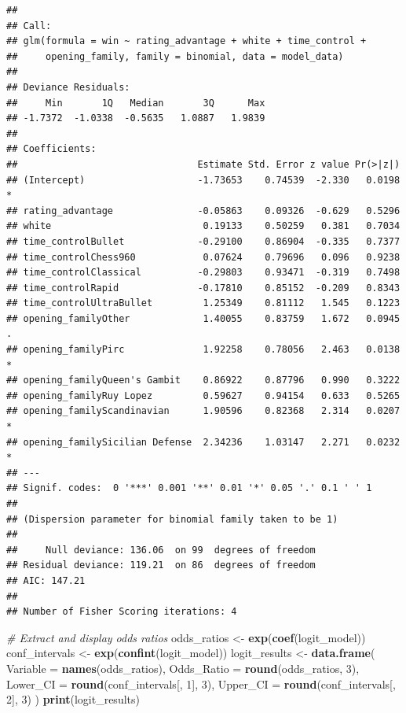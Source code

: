 \documentclass[
]{article}
\newenvironment{Shaded}{\begin{snugshade}}{\end{snugshade}}
\newcommand{\AttributeTok}[1]{\textcolor[rgb]{0.13,0.29,0.53}{#1}}
\newcommand{\CommentTok}[1]{\textcolor[rgb]{0.56,0.35,0.01}{\textit{#1}}}
\newcommand{\DecValTok}[1]{\textcolor[rgb]{0.00,0.00,0.81}{#1}}
\newcommand{\FunctionTok}[1]{\textcolor[rgb]{0.13,0.29,0.53}{\textbf{#1}}}
\newcommand{\NormalTok}[1]{#1}
\newcommand{\OtherTok}[1]{\textcolor[rgb]{0.56,0.35,0.01}{#1}}
\begin{document}
\begin{verbatim}
## 
## Call:
## glm(formula = win ~ rating_advantage + white + time_control + 
##     opening_family, family = binomial, data = model_data)
## 
## Deviance Residuals: 
##     Min       1Q   Median       3Q      Max  
## -1.7372  -1.0338  -0.5635   1.0887   1.9839  
## 
## Coefficients:
##                                Estimate Std. Error z value Pr(>|z|)  
## (Intercept)                    -1.73653    0.74539  -2.330   0.0198 *
## rating_advantage               -0.05863    0.09326  -0.629   0.5296  
## white                           0.19133    0.50259   0.381   0.7034  
## time_controlBullet             -0.29100    0.86904  -0.335   0.7377  
## time_controlChess960            0.07624    0.79696   0.096   0.9238  
## time_controlClassical          -0.29803    0.93471  -0.319   0.7498  
## time_controlRapid              -0.17810    0.85152  -0.209   0.8343  
## time_controlUltraBullet         1.25349    0.81112   1.545   0.1223  
## opening_familyOther             1.40055    0.83759   1.672   0.0945 .
## opening_familyPirc              1.92258    0.78056   2.463   0.0138 *
## opening_familyQueen's Gambit    0.86922    0.87796   0.990   0.3222  
## opening_familyRuy Lopez         0.59627    0.94154   0.633   0.5265  
## opening_familyScandinavian      1.90596    0.82368   2.314   0.0207 *
## opening_familySicilian Defense  2.34236    1.03147   2.271   0.0232 *
## ---
## Signif. codes:  0 '***' 0.001 '**' 0.01 '*' 0.05 '.' 0.1 ' ' 1
## 
## (Dispersion parameter for binomial family taken to be 1)
## 
##     Null deviance: 136.06  on 99  degrees of freedom
## Residual deviance: 119.21  on 86  degrees of freedom
## AIC: 147.21
## 
## Number of Fisher Scoring iterations: 4
\end{verbatim}

\begin{Shaded}
\begin{Highlighting}[]
\CommentTok{\# Extract and display odds ratios}
\NormalTok{odds\_ratios }\OtherTok{\textless{}{-}} \FunctionTok{exp}\NormalTok{(}\FunctionTok{coef}\NormalTok{(logit\_model))}
\NormalTok{conf\_intervals }\OtherTok{\textless{}{-}} \FunctionTok{exp}\NormalTok{(}\FunctionTok{confint}\NormalTok{(logit\_model))}
\NormalTok{logit\_results }\OtherTok{\textless{}{-}} \FunctionTok{data.frame}\NormalTok{(}
  \AttributeTok{Variable =} \FunctionTok{names}\NormalTok{(odds\_ratios),}
  \AttributeTok{Odds\_Ratio =} \FunctionTok{round}\NormalTok{(odds\_ratios, }\DecValTok{3}\NormalTok{),}
  \AttributeTok{Lower\_CI =} \FunctionTok{round}\NormalTok{(conf\_intervals[, }\DecValTok{1}\NormalTok{], }\DecValTok{3}\NormalTok{),}
  \AttributeTok{Upper\_CI =} \FunctionTok{round}\NormalTok{(conf\_intervals[, }\DecValTok{2}\NormalTok{], }\DecValTok{3}\NormalTok{)}
\NormalTok{)}
\FunctionTok{print}\NormalTok{(logit\_results)}
\end{Highlighting}
\end{Shaded}
\end{document}
